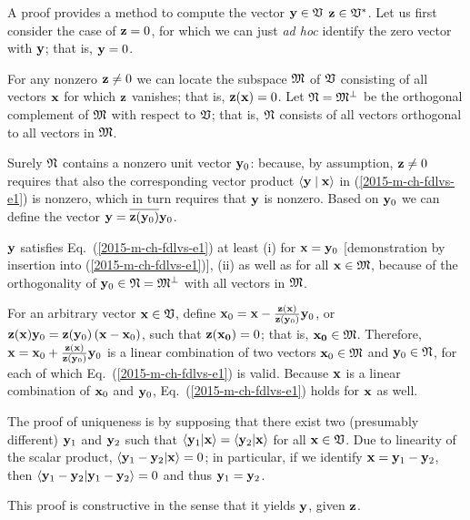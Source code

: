 {\color{OliveGreen}
\bproof
A proof provides a method to compute the vector ${\bf y} \in {\frak V}$
${\bf z} \in {\frak V}^\ast$.
Let us first consider the case
of ${\bf z} =0$, for which we can just {\it ad hoc} identify
the zero vector with ${\bf y}$; that is, ${\bf y}=0$.

For any nonzero ${\bf z} \neq 0$ we can locate the subspace
${\frak M}$ of ${\frak V}$ consisting of all vectors ${\bf x}$ for which ${\bf z}$ vanishes;
that is, ${\bf z}({\bf x})=0$.
Let  ${\frak N}={\frak M}^\perp$ be the orthogonal complement of
${\frak M}$ with respect to ${\frak V}$; that is,  ${\frak N}$ consists of all vectors orthogonal
to all vectors in  ${\frak M}$.

Surely  ${\frak N}$ contains a nonzero unit vector ${\bf y}_0$:
because, by assumption, ${\bf z} \neq 0$ requires that also the corresponding vector product
$\langle {\bf y} \mid {\bf x}\rangle$
in (\ref{2015-m-ch-fdlvs-e1}) is nonzero, which in turn requires that ${\bf y}$ is nonzero.
Based on ${\bf y}_0$ we can define the vector ${\bf y} = \overline{{\bf z}({\bf y}_0)} {\bf y}_0$.

${\bf y}$  satisfies Eq.~(\ref{2015-m-ch-fdlvs-e1}) at least
(i)
for ${\bf x} = {\bf y}_0$ [demonstration by insertion into (\ref{2015-m-ch-fdlvs-e1})],
(ii)
as well as for all ${\bf x} \in {\frak M}$,
because of the orthogonality of ${\bf y}_0 \in {\frak N}={\frak M}^\perp$ with all vectors in ${\frak M}$.

For an arbitrary vector ${\bf x} \in {\frak V}$, define
${\bf x}_0 =  {\bf x} -  \frac{{\bf z}({\bf x})}{{\bf z}({\bf y}_0)}  {\bf y}_0$,
or
$ {\bf z}({\bf x})  {\bf y}_0 = {\bf z}({\bf y}_0) \left({\bf x} - {\bf x}_0\right)$,
such that ${\bf z} ({\bf x_0})=0$; that is, ${\bf x_0} \in {\frak M}$.
Therefore,
${\bf x} =  {\bf x}_0 +  \frac{{\bf z}({\bf x})}{{\bf z}({\bf y}_0)}  {\bf y}_0$
is a linear combination of two vectors ${\bf x}_0 \in {\frak M}$ and ${\bf y}_0 \in {\frak N}$,
for each of which Eq.~(\ref{2015-m-ch-fdlvs-e1}) is valid.
Because ${\bf x}$ is a linear combination
of ${\bf x}_0$ and ${\bf y}_0$,
Eq.~(\ref{2015-m-ch-fdlvs-e1}) holds for ${\bf x}$ as well.

The proof of uniqueness is by supposing
that there exist two (presumably different) ${\bf y}_1$ and ${\bf y}_2$
such that
$
\langle {\bf y}_1 \vert {\bf x}\rangle
=
\langle {\bf y}_2 \vert {\bf x}\rangle
$ for all ${\bf x} \in {\frak V}$.
Due to linearity of the scalar product,
$
\langle {\bf y}_1-{\bf y}_2 \vert {\bf x}\rangle =0
$;
in particular, if we identify
${\bf x}={\bf y}_1-{\bf y}_2$,
then
$
\langle {\bf y}_1-{\bf y}_2 \vert {\bf y}_1-{\bf y}_2\rangle =0
$
and thus ${\bf y}_1={\bf y}_2$.

This proof is constructive in the sense that it yields ${\bf y}$, given ${\bf z}$.
\eproof
}



